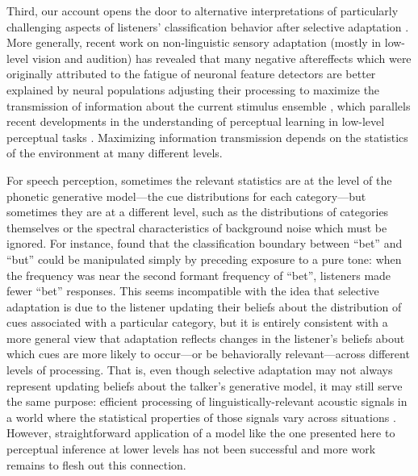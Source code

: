\label{r4-sensory-adapt}
Third, our account opens the door to alternative interpretations of particularly challenging aspects of listeners' classification behavior after selective adaptation \cite{KleinschmidtInPrep}. More generally, recent work on non-linguistic sensory adaptation (mostly in low-level vision and audition) has revealed that many negative aftereffects which were originally attributed to the fatigue of neuronal feature detectors are better explained by neural populations adjusting their processing to maximize the transmission of information about the current stimulus ensemble \cite{Brenner2000,Fairhall2001,Gutfreund2012,Kohn2007,Sharpee2006,Webster2005}, which parallels recent developments in the understanding of perceptual learning in low-level perceptual tasks \cite{Bejjanki2011a,Harris2012}.  Maximizing information transmission depends on the statistics of the environment at many different levels.

For speech perception, sometimes the relevant statistics are at the level of the phonetic generative model---the cue distributions for each category---but sometimes they are at a different level, such as the distributions of categories themselves or the spectral characteristics of background noise which must be ignored.  For instance,  found that the classification boundary between ``bet'' and ``but'' could be manipulated simply by preceding exposure to a pure tone: when the frequency was near the second formant frequency of ``bet'', listeners made fewer ``bet'' responses.  This seems incompatible with the idea that selective adaptation is due to the listener updating their beliefs about the distribution of cues associated with a particular category, but it is entirely consistent with a more general view that adaptation reflects changes in the listener's beliefs about which cues are more likely to occur---or be behaviorally relevant---across different levels of processing.  That is, even though selective adaptation may not always represent updating beliefs about the talker's generative model, it may still serve the same purpose: efficient processing of linguistically-relevant acoustic signals in a world where the statistical properties of those signals vary across situations \cite{KleinschmidtInPrep}.  However, straightforward application of a model like the one presented here to perceptual inference at lower levels has not been successful \cite{Stocker2006} and more work remains to flesh out this connection.

